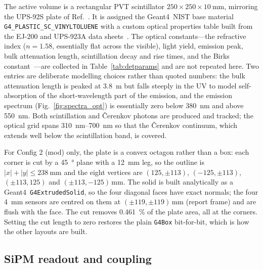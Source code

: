 \documentclass[11pt,a4paper]{article}
\newcommand{\gfour}{Geant4}
\begin{document}
The active volume is a rectangular PVT scintillator
$250 \times 250 \times \SI{10}{\milli\meter}$, mirroring the UPS-92S plate of
Ref.~\cite{Rao2025}. It is assigned the \gfour\ NIST base material
\texttt{G4\_PLASTIC\_SC\_VINYLTOLUENE} with a custom optical properties table
built from the EJ-200 and UPS-923A data
sheets~\cite{EljenEJ200,Artikov2005,AmcrysPS}. The optical constants---the
refractive index ($n = 1.58$, essentially flat across the visible), light yield,
emission peak, bulk attenuation length, scintillation decay and rise times, and
the Birks constant~\cite{Birks1951,Craun1970}---are collected in
Table~\ref{tab:detparams} and are not repeated here. Two entries are
deliberate modelling choices rather than quoted numbers: the bulk attenuation
length is peaked at \SI{3.8}{\meter} but falls steeply in the UV to model
self-absorption of the short-wavelength part of the emission, and the emission
spectrum (Fig.~\ref{fig:spectra_opt}) is essentially zero below
\SI{380}{\nano\meter} and above \SI{550}{\nano\meter}. Both scintillation
and \v{C}erenkov photons are produced and tracked; the optical grid spans
\SIrange{310}{700}{\nano\meter} so that the \v{C}erenkov continuum, which
extends well below the scintillation band, is covered.

For Config 2 (mod) only, the plate is a convex octagon rather than a box: each
corner is cut by a \SI{45}{\degree} plane with a \SI{12}{\milli\meter} leg, so
the outline is $\lvert x\rvert+\lvert y\rvert \le \SI{238}{\milli\meter}$ and
the eight vertices are $(125,\pm113)$, $(-125,\pm113)$, $(\pm113,125)$ and
$(\pm113,-125)\,\si{\milli\meter}$. The solid is built
analytically as a \gfour\ \texttt{G4ExtrudedSolid}, so the four diagonal faces
have exact normals; the four \SI{4}{\milli\meter} sensors are centred on them at
$(\pm119,\pm119)\,\si{\milli\meter}$ (report frame) and are flush with the
face. The cut removes \SI{0.461}{\percent} of the plate area, all at the
corners. Setting the cut length to zero restores the plain \texttt{G4Box}
bit-for-bit, which is how the other layouts are built.

\subsection{SiPM readout and coupling}
\end{document}
